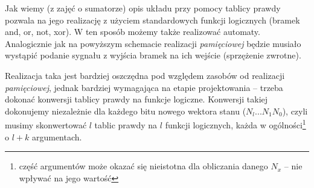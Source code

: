 \documentclass{pdfBooklets}
\begin{document}
Jak wiemy (z zajęć o sumatorze) opis układu przy pomocy tablicy prawdy pozwala na jego realizację z użyciem standardowych funkcji logicznych (bramek and, or, not, xor). W ten sposób możemy także realizować automaty. Analogicznie jak na powyższym schemacie realizacji \emph{pamięciowej} będzie musiało wystąpić podanie sygnału z wyjścia bramek na ich wejście (sprzężenie zwrotne).

Realizacja taka jest bardziej oszczędna pod względem zasobów od realizacji \emph{pamięciowej}, jednak bardziej wymagająca na etapie projektowania – trzeba dokonać konwersji tablicy prawdy na funkcje logiczne. Konwersji takiej dokonujemy niezależnie dla każdego bitu nowego wektora stanu ($N_l ... N_1 N_0$), czyli musimy skonwertować $l$ tablic prawdy na $l$ funkcji logicznych, każda w ogólności\footnote{część argumentów może okazać się nieistotna dla obliczania danego $N_x$ – nie wpływać na jego wartość} o $l+k$ argumentach.
\end{document}
